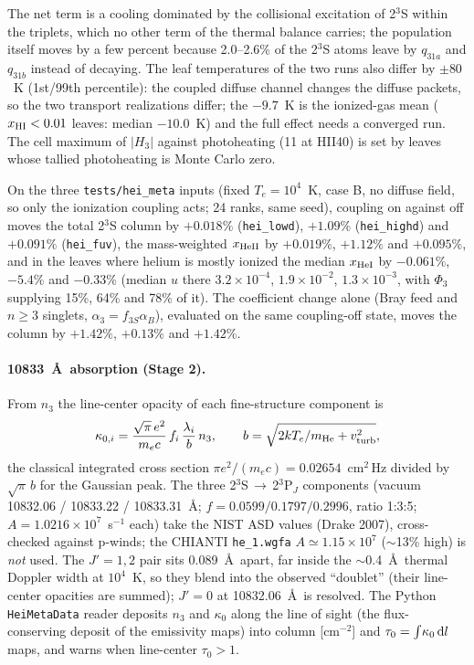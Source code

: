 \documentclass[english,a4paper]{my_memo}
\newcommand{\code}[1]{\texttt{#1}}
\begin{document}
The net term is a cooling dominated by the collisional excitation of
2$^3$S within the triplets, which no other term of the thermal balance
carries; the population itself moves by a few percent because 2.0--2.6\% of
the 2$^3$S atoms leave by $q_{31a}$ and $q_{31b}$ instead of decaying.  The
leaf temperatures of the two runs also differ by $\pm80$~K (1st/99th
percentile): the coupled diffuse channel changes the diffuse packets, so the
two transport realizations differ; the $-9.7$~K is the ionized-gas mean
($x_{\rm HI}<0.01$ leaves: median $-10.0$~K) and the full effect needs a
converged run.  The cell maximum of $|H_3|$ against photoheating (11 at
HII40) is set by leaves whose tallied photoheating is Monte Carlo zero.

On the three \code{tests/hei\_meta} inputs (fixed $T_e = 10^4$~K, case B, no
diffuse field, so only the ionization coupling acts; 24 ranks, same seed),
coupling on against off moves the total 2$^3$S column by $+0.018\%$
(\code{hei\_lowd}), $+1.09\%$ (\code{hei\_highd}) and $+0.091\%$
(\code{hei\_fuv}), the mass-weighted $x_{\rm HeII}$ by $+0.019\%$, $+1.12\%$
and $+0.095\%$, and in the leaves where helium is mostly ionized the median
$x_{\rm HeI}$ by $-0.061\%$, $-5.4\%$ and $-0.33\%$ (median $u$ there
$3.2{\times}10^{-4}$, $1.9{\times}10^{-2}$, $1.3{\times}10^{-3}$, with
$\Phi_3$ supplying 15\%, 64\% and 78\% of it).  The coefficient change alone
(Bray feed and $n\ge3$ singlets, $\alpha_3 = f_{3S}\alpha_B$), evaluated on
the same coupling-off state, moves the column by $+1.42\%$, $+0.13\%$ and
$+1.42\%$.

\paragraph{10833~\AA\ absorption (Stage 2).}  From $n_3$ the line-center
opacity of each fine-structure component is
\begin{equation}
\kappa_{0,i} = \frac{\sqrt{\pi}\,e^2}{m_e c}\,f_i\,\frac{\lambda_i}{b}\,n_3,
\qquad b = \sqrt{2 k T_e/m_{\rm He} + v_{\rm turb}^2},
\end{equation}
the classical integrated cross section $\pi e^2/(m_e c) = 0.02654$~cm$^2$\,Hz
divided by $\sqrt{\pi}\,b$ for the Gaussian peak.  The three
2$^3$S\,$\to$\,2$^3$P$_J$ components (vacuum 10832.06 / 10833.22 /
10833.31~\AA; $f = 0.0599 / 0.1797 / 0.2996$, ratio 1:3:5; $A =
1.0216{\times}10^7$~s$^{-1}$ each) take the NIST ASD values (Drake 2007),
cross-checked against p-winds; the CHIANTI \code{he\_1.wgfa} $A \simeq
1.15{\times}10^7$ ($\sim$13\% high) is \emph{not} used.  The $J'=1,2$ pair sits
0.089~\AA\ apart, far inside the $\sim$0.4~\AA\ thermal Doppler width at
$10^4$~K, so they blend into the observed ``doublet'' (their line-center
opacities are summed); $J'=0$ at 10832.06~\AA\ is resolved.  The Python
\code{HeiMetaData} reader deposits $n_3$ and $\kappa_0$ along the line of
sight (the flux-conserving deposit of the emissivity maps) into column
[cm$^{-2}$] and $\tau_0 = \int\!\kappa_0\,{\rm d}l$ maps, and warns when
line-center $\tau_0 > 1$.
\end{document}
